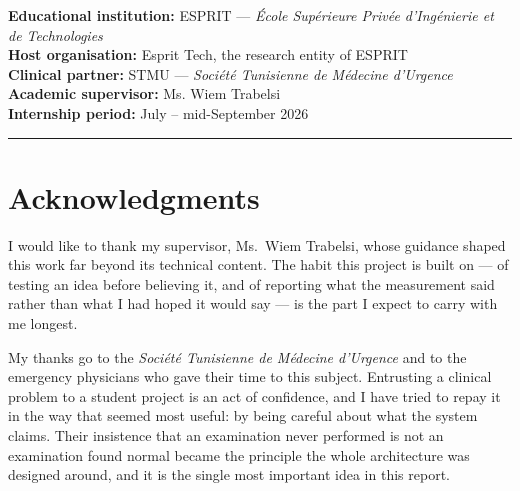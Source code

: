 \documentclass[11pt, a4paper]{article}
\begin{document}
\begin{sloppypar}
\begin{titlepage}
\begin{center}
    \vfill

    \begin{flushleft}\large
      \textbf{Educational institution:} ESPRIT --- \textit{École Supérieure Privée
        d'Ingénierie et de Technologies}\\[0.35cm]
      \textbf{Host organisation:} Esprit Tech, the research entity of ESPRIT\\[0.35cm]
      \textbf{Clinical partner:} STMU --- \textit{Société Tunisienne de Médecine
        d'Urgence}\\[0.35cm]
      \textbf{Academic supervisor:} Ms. Wiem Trabelsi\\[0.35cm]
      \textbf{Internship period:} July -- mid-September 2026
    \end{flushleft}

    \vspace{0.6cm}
    \noindent\rule{\textwidth}{0.6pt}
  \end{center}
  \setcounter{page}{0}
\end{titlepage}
\restoregeometry

\setcounter{page}{-5}

\section*{Acknowledgments}

I would like to thank my supervisor, Ms.~Wiem Trabelsi, whose guidance shaped this work far
beyond its technical content. The habit this project is built on --- of testing an idea before
believing it, and of reporting what the measurement said rather than what I had hoped it would
say --- is the part I expect to carry with me longest.

My thanks go to the \textit{Société Tunisienne de Médecine d'Urgence} and to the emergency
physicians who gave their time to this subject. Entrusting a clinical problem to a student
project is an act of confidence, and I have tried to repay it in the way that seemed most
useful: by being careful about what the system claims. Their insistence that an examination
never performed is not an examination found normal became the principle the whole architecture
was designed around, and it is the single most important idea in this report.


\end{sloppypar}
\end{document}
